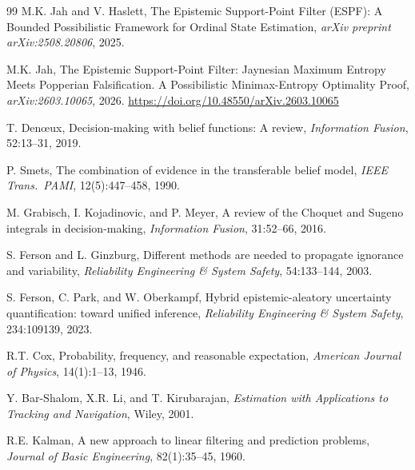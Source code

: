 \documentclass[12pt]{article}
\begin{document}
\begin{thebibliography}{99}
M.K. Jah and V. Haslett, The Epistemic Support-Point Filter (ESPF):
A Bounded Possibilistic Framework for Ordinal State Estimation,
\textit{arXiv preprint arXiv:2508.20806}, 2025.

M.K. Jah, The Epistemic Support-Point Filter: Jaynesian Maximum Entropy
Meets Popperian Falsification. A Possibilistic Minimax-Entropy Optimality
Proof, \textit{arXiv:2603.10065}, 2026. \url{https://doi.org/10.48550/arXiv.2603.10065}

T. Den\oe{}ux, Decision-making with belief functions: A review,
\textit{Information Fusion}, 52:13--31, 2019.

P. Smets, The combination of evidence in the transferable belief model,
\textit{IEEE Trans.\ PAMI}, 12(5):447--458, 1990.

M. Grabisch, I. Kojadinovic, and P. Meyer, A review of the Choquet and
Sugeno integrals in decision-making,
\textit{Information Fusion}, 31:52--66, 2016.

S. Ferson and L. Ginzburg, Different methods are needed to propagate
ignorance and variability,
\textit{Reliability Engineering \& System Safety}, 54:133--144, 2003.

S. Ferson, C. Park, and W. Oberkampf, Hybrid epistemic-aleatory uncertainty
quantification: toward unified inference,
\textit{Reliability Engineering \& System Safety}, 234:109139, 2023.

R.T. Cox, Probability, frequency, and reasonable expectation,
\textit{American Journal of Physics}, 14(1):1--13, 1946.

Y. Bar-Shalom, X.R. Li, and T. Kirubarajan,
\textit{Estimation with Applications to Tracking and Navigation},
Wiley, 2001.

R.E. Kalman, A new approach to linear filtering and prediction problems,
\textit{Journal of Basic Engineering}, 82(1):35--45, 1960.

\end{thebibliography}
\end{document}
